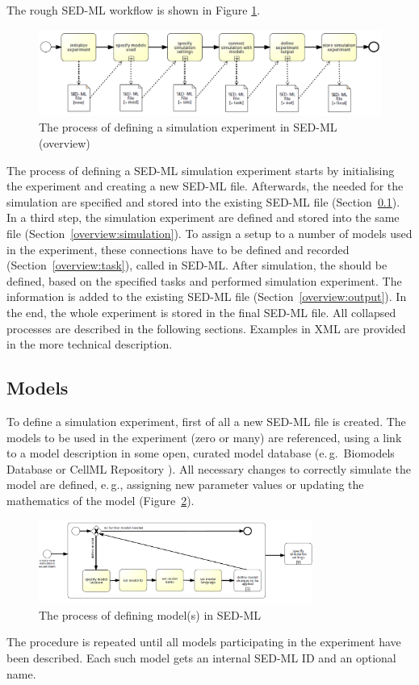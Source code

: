 %
The rough SED-ML workflow is shown in Figure \ref{fig:sedmlWorkflow}.
%
\begin{figure}[h]
\centering
\includegraphics[width=\textwidth]{images/bpmn/sedMainOryx.png}
\caption{The process of defining a simulation experiment in SED-ML (overview)}
\label{fig:sedmlWorkflow}
\end{figure}
%
The process of defining a SED-ML simulation experiment starts by initialising the experiment and creating a new SED-ML file. Afterwards, the  needed for the simulation are specified and stored into the existing SED-ML file (Section~\ref{overview:models}). In a third step, the simulation experiment  are defined and stored into the same file (Section~\ref{overview:simulation}). To assign a setup to a number of models used in the experiment, these connections have to be defined and recorded (Section~\ref{overview:task}), called  in SED-ML. After simulation, the  should be defined, based on the specified tasks and performed simulation experiment. The information is added to the existing SED-ML file (Section~\ref{overview:output}). In the end, the whole experiment is stored in the final SED-ML file.
%
All collapsed processes are described in the following sections. Examples in XML are provided in the more technical description.

\subsection{Models}
\label{overview:models}
To define a simulation experiment, first of all a new SED-ML file is created. The models to be used in the experiment (zero or many) are referenced, using a link to a model description in some open, curated model database (e.\,g.\ Biomodels Database \citep{LDR+10} or CellML Repository \citep{BBC+09}). All necessary changes to correctly simulate the model are defined, e.\,g., assigning new parameter values or updating the mathematics of the model (Figure~\ref{fig:workflowModel}).
%
\begin{figure}[h]
\centering
\includegraphics[width=0.8\textwidth]{images/bpmn/sedModelOryx.png}
\caption{The process of defining model(s) in SED-ML}
\label{fig:workflowModel}
\end{figure}
%
The procedure is repeated until all models participating in the experiment have been described. Each such model gets an internal SED-ML ID and an optional name.


